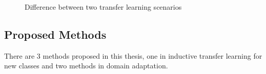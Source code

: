 \begin{figure}[h]
	\centering
	\qquad
	\caption{Difference between two transfer learning scenarios}\label{fig:intro:cmp}
\end{figure}


\subsection{Proposed Methods}
There are 3 methods proposed in this thesis, one in inductive transfer learning for new classes and two methods in domain adaptation.



